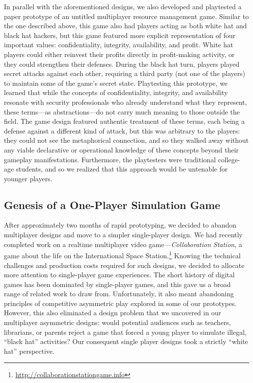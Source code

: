 \documentclass[letterpaper]{article}
\begin{document}
In parallel with the aforementioned designs, we also developed and
playtested a paper prototype of an untitled
multiplayer resource management game.
Similar to the one described above, 
this game also had players acting as both white hat and black hat hackers,
but this game featured more explicit representation of four
important values: confidentiality, integrity, availability, and profit.
White hat players could either reinvest their profits directly in
profit-making activity, or they could strengthen their defenses.
During the black hat turn, players played secret attacks against 
each other, requiring a third party (not one of the players) to maintain
some of the game's secret state.
Playtesting this prototype, we learned that 
while the concepts of confidentiality, integrity, and availability
resonate with security professionals who already understand what
they represent, these terms---as abstractions---do not carry much meaning
to those outside the field.
The game design featured authentic treatment of these terms,
each being a defense against a different kind of attack,
but this was arbitrary to the players: they could not see the metaphorical
connection, and so they walked away without any viable 
declarative or operational knowledge of these concepts beyond their
gameplay manifestations.
Furthermore, the playtesters were traditional college-age students,
and so we realized that this approach would be untenable for
younger players.

\subsection{Genesis of a One-Player Simulation Game}

After approximately two months of rapid prototyping, we decided
to abandon multiplayer designs and move to a simpler single-player
design. We had recently completed work on a realtime
multiplayer video 
game---\textit{Collaboration Station}, a game about the life on the
International Space Station.\footnote{\url{http://collaborationstationgame.info}}
Knowing the technical challenges and production costs required
for such designs, we decided to allocate more attention to single-player
game experiences. The short history of digital games has been
dominated by single-player games, and this gave us a broad range of
related work to draw from. Unfortunately, it also meant abandoning
principles of competitive asymmetric play explored in some of our
prototypes.
However, this also eliminated a design problem that we uncovered
in our multiplayer asymmetric designs: would potential audiences
such as teachers, librarians, or parents 
reject a game that forced a young
player to simulate illegal, ``black hat'' activities? 
Our consequent single player designs
took a strictly ``white hat'' perspective.
\end{document}
